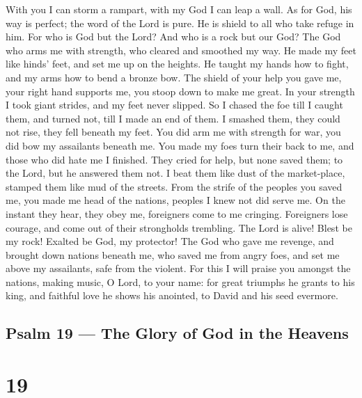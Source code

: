  With you I can storm a rampart, with my God I can leap a
wall.  As for God, his way is perfect; the word of the Lord
is pure. He is shield to all who take refuge in him.  For
who is God but the Lord? And who is a rock but our God? 
The God who arms me with strength, who cleared and smoothed my way.
 He made my feet like hinds' feet, and set me up on the
heights.  He taught my hands how to fight, and my arms how
to bend a bronze bow.  The shield of your help you gave me,
your right hand supports me, you stoop down to make me great.
 In your strength I took giant strides, and my feet never
slipped.  So I chased the foe till I caught them, and
turned not, till I made an end of them.  I smashed them,
they could not rise, they fell beneath my feet.  You did
arm me with strength for war, you did bow my assailants beneath me.
 You made my foes turn their back to me, and those who did
hate me I finished.  They cried for help, but none saved
them; to the Lord, but he answered them not.  I beat them
like dust of the market-place, stamped them like mud of the streets.
 From the strife of the peoples you saved me, you made me
head of the nations, peoples I knew not did serve me.  On
the instant they hear, they obey me, foreigners come to me cringing.
 Foreigners lose courage, and come out of their strongholds
trembling.  The Lord is alive! Blest be my rock! Exalted be
God, my protector!  The God who gave me revenge, and
brought down nations beneath me,  who saved me from angry
foes, and set me above my assailants, safe from the violent.
 For this I will praise you amongst the nations, making
music, O Lord, to your name:  for great triumphs he grants
to his king, and faithful love he shows his anointed, to David and his
seed evermore.

\hypertarget{psalm-19-the-glory-of-god-in-the-heavens}{%
\subsection{Psalm 19 --- The Glory of God in the
Heavens}\label{psalm-19-the-glory-of-god-in-the-heavens}}

\hypertarget{section-18}{%
\section{19}\label{section-18}}

